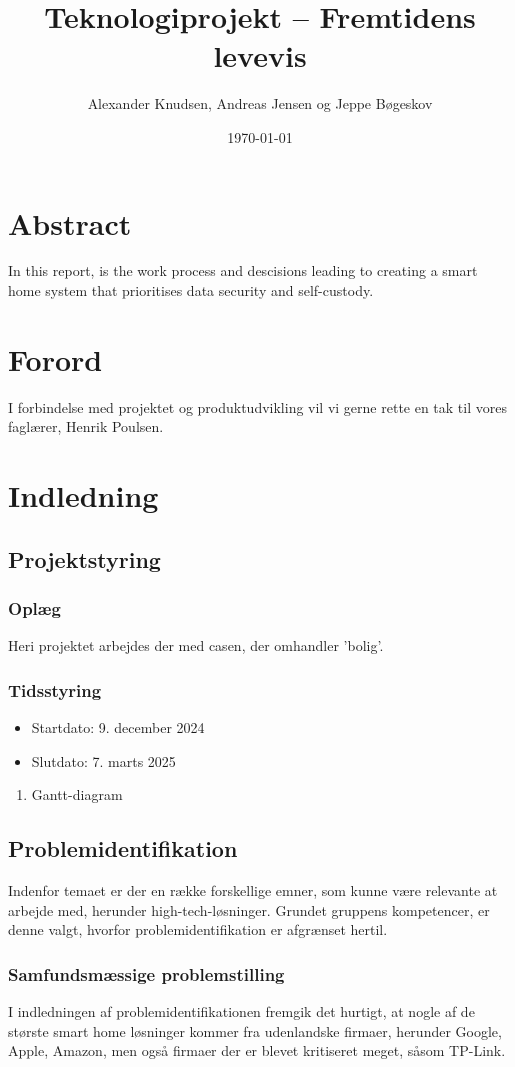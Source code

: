 \documentclass[11pt]{article}
\author{Alexander Knudsen, Andreas Jensen og Jeppe Bøgeskov}
\date{\today}
\title{Teknologiprojekt -- Fremtidens levevis}
\begin{document}


\restoregeometry
\tableofcontents
\newpage
\section{Abstract}
\label{sec:org6419ad8}
In this report, is the work process and descisions leading to creating a smart home system that prioritises data security and self-custody.
\newpage
\section{Forord}
\label{sec:org4e437e0}
I forbindelse med projektet og produktudvikling vil vi gerne rette en tak til vores faglærer, Henrik Poulsen.
\newpage
\section{Indledning}
\label{sec:org6d9531c}
\subsection{Projektstyring}
\label{sec:org5e3ff51}
\subsubsection{Oplæg}
\label{sec:orgbec7f1d}
Heri projektet arbejdes der med casen, der omhandler 'bolig'.
\subsubsection{Tidsstyring}
\label{sec:org730faaa}
\begin{itemize}
\item Startdato: 9. december 2024
\item Slutdato: 7. marts 2025
\end{itemize}
\begin{enumerate}
\item Gantt-diagram
\label{sec:orgb1d2daa}
\end{enumerate}
\subsection{Problemidentifikation}
\label{sec:orgfafb1b0}
Indenfor temaet er der en række forskellige emner, som kunne være relevante at arbejde med, herunder high-tech-løsninger. Grundet gruppens kompetencer, er denne valgt, hvorfor problemidentifikation er afgrænset hertil.
\subsubsection{Samfundsmæssige problemstilling}
\label{sec:orga952bf5}
I indledningen af problemidentifikationen fremgik det hurtigt, at nogle af de største smart home løsninger kommer fra udenlandske firmaer, herunder Google, Apple, Amazon, men også firmaer der er blevet kritiseret meget, såsom TP-Link. 
\end{document}
